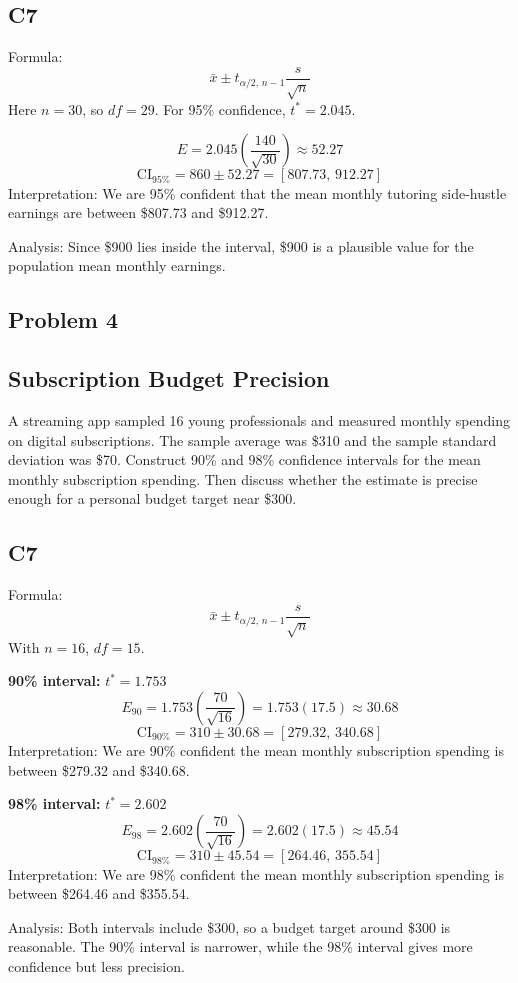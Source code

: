 \subsection*{C7}
Formula:
\[
\bar{x} \pm t_{\alpha/2,\,n-1}\frac{s}{\sqrt{n}}
\]
Here \(n=30\), so \(df=29\). For 95\% confidence, \(t^*=2.045\).

\[
E=2.045\left(\frac{140}{\sqrt{30}}\right)\approx 52.27
\]
\[
\text{CI}_{95\%}=860\pm 52.27=[807.73,\,912.27]
\]
Interpretation: We are 95\% confident that the mean monthly tutoring side-hustle earnings are between \$807.73 and \$912.27.

Analysis: Since \$900 lies inside the interval, \$900 is a plausible value for the population mean monthly earnings.

\subsection*{Problem 4}
\subsection*{Subscription Budget Precision}
A streaming app sampled 16 young professionals and measured monthly spending on digital subscriptions. The sample average was \$310 and the sample standard deviation was \$70. Construct 90\% and 98\% confidence intervals for the mean monthly subscription spending. Then discuss whether the estimate is precise enough for a personal budget target near \$300.

\subsection*{C7}
Formula:
\[
\bar{x} \pm t_{\alpha/2,\,n-1}\frac{s}{\sqrt{n}}
\]
With \(n=16\), \(df=15\).

\textbf{90\% interval:} \(t^*=1.753\)
\[
E_{90}=1.753\left(\frac{70}{\sqrt{16}}\right)=1.753(17.5)\approx 30.68
\]
\[
\text{CI}_{90\%}=310\pm 30.68=[279.32,\,340.68]
\]
Interpretation: We are 90\% confident the mean monthly subscription spending is between \$279.32 and \$340.68.

\textbf{98\% interval:} \(t^*=2.602\)
\[
E_{98}=2.602\left(\frac{70}{\sqrt{16}}\right)=2.602(17.5)\approx 45.54
\]
\[
\text{CI}_{98\%}=310\pm 45.54=[264.46,\,355.54]
\]
Interpretation: We are 98\% confident the mean monthly subscription spending is between \$264.46 and \$355.54.

Analysis: Both intervals include \$300, so a budget target around \$300 is reasonable. The 90\% interval is narrower, while the 98\% interval gives more confidence but less precision.


